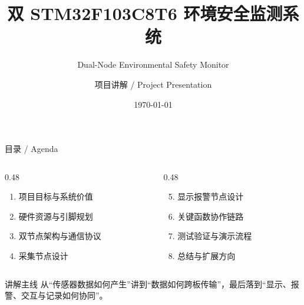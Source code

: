 \documentclass[aspectratio=169,10pt]{ctexbeamer}
\title[Dual STM32 Safety Monitor]{双 STM32F103C8T6 环境安全监测系统}
\subtitle{Dual-Node Environmental Safety Monitor}
\author{项目讲解 / Project Presentation}
\institute{STM32F103C8T6 \quad USART3 \quad OLED \quad Local Alarm}
\date{\today}
\begin{document}
\begin{frame}[plain]
  \titlepage
\end{frame}

\begin{frame}{目录 / Agenda}
  \begin{columns}[T,onlytextwidth]
    \begin{column}{0.48\textwidth}
      \begin{enumerate}
        \item 项目目标与系统价值
        \item 硬件资源与引脚规划
        \item 双节点架构与通信协议
        \item 采集节点设计
      \end{enumerate}
    \end{column}
    \begin{column}{0.48\textwidth}
      \begin{enumerate}
        \setcounter{enumi}{4}
        \item 显示报警节点设计
        \item 关键函数协作链路
        \item 测试验证与演示流程
        \item 总结与扩展方向
      \end{enumerate}
    \end{column}
  \end{columns}
  \vspace{0.7em}
  \begin{block}{讲解主线}
    从“传感器数据如何产生”讲到“数据如何跨板传输”，最后落到“显示、报警、交互与记录如何协同”。
  \end{block}
\end{frame}
\end{document}
